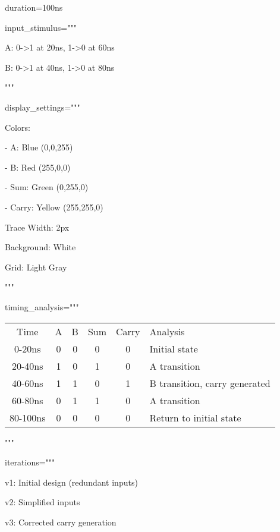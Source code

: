 \documentclass[11pt]{article}
\begin{document}
\noindent duration=100ns

\noindent input\_stimulus="""

\noindent A: 0->1 at 20ns, 1->0 at 60ns

\noindent B: 0->1 at 40ns, 1->0 at 80ns

\noindent """

\vspace{0.5em}


\noindent display\_settings="""

\noindent Colors:

\noindent - A: Blue (0,0,255)

\noindent - B: Red (255,0,0)

\noindent - Sum: Green (0,255,0)

\noindent - Carry: Yellow (255,255,0)

\vspace{0.5em}

\noindent Trace Width: 2px

\noindent Background: White

\noindent Grid: Light Gray

\noindent """

\vspace{0.5em}


\noindent timing\_analysis="""
\begin{tabular}{c|c|c|c|c|l}
Time     & A & B & Sum & Carry & Analysis \\
0-20ns   & 0 & 0 &  0  &   0   & Initial state \\
20-40ns  & 1 & 0 &  1  &   0   & A transition \\
40-60ns  & 1 & 1 &  0  &   1   & B transition, carry generated \\
60-80ns  & 0 & 1 &  1  &   0   & A transition \\
80-100ns & 0 & 0 &  0  &   0   & Return to initial state
\end{tabular}
\noindent """

\vspace{0.5em}


\noindent iterations="""

\noindent v1: Initial design (redundant inputs)

\noindent v2: Simplified inputs

\noindent v3: Corrected carry generation
\end{document}
